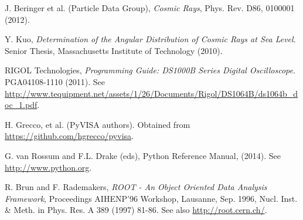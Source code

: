 \begin{thebibliography}{9}

J. Beringer et al. (Particle Data Group), \emph{Cosmic Rays}, Phys. Rev. D86, 0100001 (2012).

Y. Kuo, \emph{Determination of the Angular Distribution of Cosmic Rays at Sea Level}. Senior Thesis, Massachusetts Institute of Technology (2010). 

RIGOL Technologies, \emph{Programming Guide: DS1000B Series Digital Oscilloscope}. PGA04108-1110 (2011). See \url{http://www.tequipment.net/assets/1/26/Documents/Rigol/DS1064B/ds1064b_doc_1.pdf}. 

H. Grecco, et al. (PyVISA authors). Obtained from \url{https://github.com/hgrecco/pyvisa}. 

G. van Rossum and F.L. Drake (eds), Python Reference Manual, (2014). See \url{http://www.python.org}.  

R. Brun and F. Rademakers, \emph{ROOT - An Object Oriented Data Analysis Framework}, Proceedings AIHENP'96 Workshop, Lausanne, Sep. 1996, Nucl. Inst. \& Meth. in Phys. Res. A 389 (1997) 81-86. See also \url{http://root.cern.ch/}.

\end{thebibliography}

\clearpage

